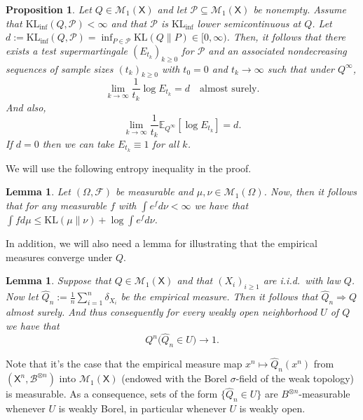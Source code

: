 \documentclass[11pt]{article}
\newcommand{\KL}{\mathrm{KL}}
\newcommand{\KLinf}{\mathrm{KL}_{\mathrm{inf}}}
\newcommand{\E}{\mathbb{E}}
\newcommand{\Pcal}{\mathcal{P}}
\newcommand{\X}{\mathsf{X}}
\newcommand{\B}{\mathcal{B}}
\newtheorem{proposition}[theorem]{Proposition}
\newtheorem{lemma}[theorem]{Lemma}
\theoremstyle{definition}
\theoremstyle{definition}
\begin{document}
\begin{proposition}\label{prop:eprocess-rate}
Let $Q\in\mathcal M_1(\X)$ and let $\Pcal\subseteq\mathcal M_1(\X)$ be nonempty. Assume that $\KLinf(Q,\Pcal)<\infty$ and that $\Pcal$ is $\KLinf$ lower semicontinuous at $Q$. Let $d:=\KLinf(Q,\Pcal)=\inf_{P\in\Pcal}\KL(Q\|P)\in[0,\infty)$. Then, it follows that there exists a test supermartingale $(E_{t_k})_{k\ge 0}$ for $\Pcal$ and an associated nondecreasing sequences of sample sizes $(t_k)_{k\ge 0}$ with $t_0=0$ and $t_k\to\infty$ such that under $Q^\infty$,
\[
\lim_{k\to\infty}\frac{1}{t_k}\log E_{t_k} = d\quad{\text{almost surely.}}
\]
And also,
\[
\lim_{k\to\infty}\frac{1}{t_k}\E_{Q^\infty}[\log E_{t_k}]=d.
\]
If $d=0$ then we can take $E_{t_k}\equiv1$ for all $k$.
\end{proposition}

We will use the following entropy inequality in the proof.

\begin{lemma}\label{lem:entropy-ineq}
Let $(\Omega, \mathcal F)$ be measurable and $\mu, \nu\in\mathcal M_1(\Omega)$. Now, then it follows that for any measurable $f$ with $\int e^{f}d\nu<\infty$ we have that $\int fd\mu \le \KL(\mu\|\nu)+\log\int e^{f}d\nu$.    
\end{lemma}

In addition, we will also need a lemma for illustrating that the empirical measures converge under $Q$. 

\begin{lemma}\label{lem:empirical-conv}
Suppose that $Q\in\mathcal{M}_1(\X)$ and that $(X_i)_{i\ge 1}$ are i.i.d.\ with law $Q$. Now let $\widehat{Q}_n:=\frac{1}{n}\sum_{i=1}^n\delta_{X_i}$ be the empirical measure. Then it follows that $\widehat{Q}_n\Rightarrow Q$ almost surely. And thus consequently for every weakly open neighborhood $U$ of $Q$ we have that
\[
Q^n\bigl(\widehat{Q}_n\in U\bigr)\longrightarrow1.
\]
\end{lemma}

Note that it's the case that the empirical measure map $x^n\mapsto \widehat Q_n(x^n)$ from $(\X^n,\B^{\otimes n})$ into $\mathcal{M}_1(\X)$ (endowed with the Borel $\sigma$-field of the weak topology) is measurable. As a consequence, sets of the form $\{\widehat Q_n\in U\}$ are $B^{\otimes n}$-measurable whenever $U$ is weakly Borel, in particular whenever $U$ is weakly open.
\end{document}
